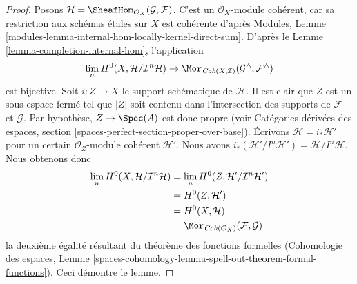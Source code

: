 \begin{proof}
Posons $\mathcal{H} = \SheafHom_{\mathcal{O}_X}(\mathcal{G}, \mathcal{F})$.
C'est un $\mathcal{O}_X$-module cohérent, car sa restriction
aux schémas étales sur $X$ est cohérente d'après
Modules, Lemme \ref{modules-lemma-internal-hom-locally-kernel-direct-sum}.
D'après le Lemme \ref{lemma-completion-internal-hom}, l'application
$$
\lim_n H^0(X, \mathcal{H}/\mathcal{I}^n\mathcal{H})
\to
\Mor_{\textit{Coh}(X, \mathcal{I})}
(\mathcal{G}^\wedge, \mathcal{F}^\wedge)
$$
est bijective. Soit $i : Z \to X$ le support schématique de
$\mathcal{H}$. Il est clair que $Z$ est un sous-espace fermé tel
que $|Z|$ soit contenu dans l'intersection des supports de $\mathcal{F}$
et $\mathcal{G}$. Par hypothèse, $Z \to \Spec(A)$ est donc propre
(voir Catégories dérivées des espaces, section
\ref{spaces-perfect-section-proper-over-base}).
Écrivons $\mathcal{H} = i_*\mathcal{H}'$ pour un certain
$\mathcal{O}_Z$-module cohérent $\mathcal{H}'$. Nous avons
$i_*(\mathcal{H}'/I^n\mathcal{H}') = \mathcal{H}/I^n\mathcal{H}$.
Nous obtenons donc
\begin{align*}
\lim_n H^0(X, \mathcal{H}/\mathcal{I}^n\mathcal{H})
& =
\lim_n H^0(Z, \mathcal{H}'/\mathcal{I}^n\mathcal{H}') \\
& =
H^0(Z, \mathcal{H}') \\
& =
H^0(X, \mathcal{H}) \\
& = 
\Mor_{\textit{Coh}(\mathcal{O}_X)}(\mathcal{F}, \mathcal{G})
\end{align*}
la deuxième égalité résultant du théorème des fonctions formelles
(Cohomologie des espaces, Lemme
\ref{spaces-cohomology-lemma-spell-out-theorem-formal-functions}).
Ceci démontre le lemme.
\end{proof}

